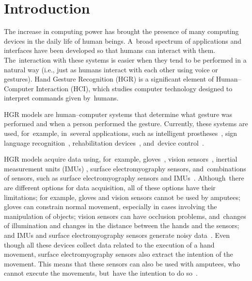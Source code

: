 \documentclass[sensors,review,accept,moreauthors,pdftex]{Definitions/mdpi}
\begin{document}




\section{Introduction}
\label{sec:introduction}


The increase in computing power has brought the presence of many computing devices in the daily life of human beings. A~broad spectrum of applications and interfaces have been developed so that humans can interact with them. The~interaction with these systems is easier when they tend to be performed in a natural way (i.e., just as humans interact with each other using voice or gestures). Hand Gesture Recognition (HGR) is a significant element of Human--Computer Interaction (HCI), which studies computer technology designed to interpret commands given by~humans. 

HGR models are human--computer systems that determine what gesture was performed and when a person performed the gesture. Currently, these systems are used, for~example, in~several applications, such as intelligent prostheses~\cite{Shi2018a,Tavakoli2017,Wang2017}, sign language recognition~\cite{Islam2017,Savur2015}, rehabilitation devices~\cite{li2017hand,nelson2018evaluating}, and~device control~\cite{sarkar2016gesture}.


HGR models acquire data using, for~example, gloves~\cite{estrada2017gesture}, vision sensors~\cite{pisharady2015recent}, inertial measurement units (IMUs) \cite{moschetti2016recognition}, surface electromyography sensors, and~combinations of sensors, such as surface electromyography sensors and IMUs~\cite{zhang2009hand}. Although~there are different options for data acquisition, all of these options have their limitations; for example, gloves and vision sensors cannot be used by amputees; gloves can constrain normal movement, especially in cases involving the manipulation of objects; vision sensors can have occlusion problems, and~changes of illumination and changes in the distance between the hands and the sensors; and IMUs and surface electromyography sensors generate noisy data~\cite{el2004wavelet,de2010filtering}. Even though all these devices collect data related to the execution of a hand movement, surface electromyography sensors also extract the intention of the movement. This means that these sensors can also be used with amputees, who cannot execute the movements, but~have the intention to do so~\cite{weiss2015easy,rodriguez2012emg}.  
\end{document}
